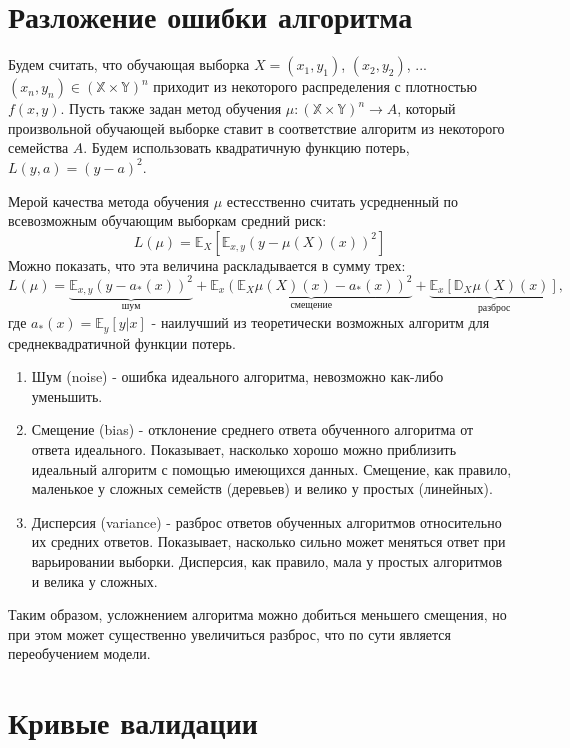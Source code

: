 \section{Разложение ошибки алгоритма}

Будем считать, что обучающая выборка $X = (x_1, y_1)$, $(x_2, y_2)$, ... $(x_n, y_n) \in (\mathbb{X}\times\mathbb{Y})^n$ приходит из некоторого распределения с плотностью $f(x, y)$. Пусть также задан метод обучения $\mu: (\mathbb{X}\times\mathbb{Y})^n \rightarrow A$, который произвольной обучающей выборке ставит в соответствие алгоритм из некоторого семейства $A$. Будем использовать квадратичную функцию потерь, $L(y, a) = (y - a)^2$.

Мерой качества метода обучения $\mu$ естесственно считать усредненный по всевозможным обучающим выборкам средний риск:
$$
L(\mu) = \mathbb{E}_X\left[\mathbb{E}_{x,y}\left(y - \mu(X)(x)\right)^2 \right]
$$
Можно показать, что эта величина раскладывается в сумму трех:
$$
L(\mu) = \underbrace{\mathbb{E}_{x,y}\left(y - a_{*}(x)\right)^2}_\text{шум} +
         \underbrace{\mathbb{E}_x\left(\mathbb{E}_X\mu(X)(x) - a_{*}(x)\right)^2}_\text{смещение} +
         \underbrace{\mathbb{E}_x\left[\mathbb{D}_X\mu(X)(x)\right]}_\text{разброс},
$$
где $a_{*}(x) = \mathbb{E}_y\left[y|x\right]$ - наилучший из теоретически возможных алгоритм для среднеквадратичной функции потерь. 

\begin{enumerate}
    \item Шум (noise) - ошибка идеального алгоритма, невозможно как-либо уменьшить.
    \item Смещение (bias) - отклонение среднего ответа обученного алгоритма от ответа идеального. Показывает, насколько хорошо можно приблизить идеальный алгоритм с помощью имеющихся данных. Смещение, как правило, маленькое у сложных семейств (деревьев) и велико у простых (линейных).
    \item Дисперсия (variance) - разброс ответов обученных алгоритмов относительно их средних ответов. Показывает, насколько сильно может меняться ответ при варьировании выборки. Дисперсия, как правило, мала у простых алгоритмов и велика у сложных.
\end{enumerate}

Таким образом, усложнением алгоритма можно добиться меньшего смещения, но при этом может существенно увеличиться разброс, что по сути является переобучением модели.


\section{Кривые валидации}

